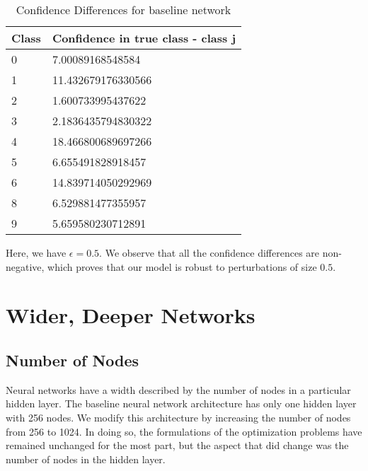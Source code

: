 \documentclass{article}
\begin{document}
\begin{table}[h]
\centering
\begin{tabular}{|l|l|}
\hline
Class & Confidence in true class - class j \\ \hline
0     & 7.00089168548584                   \\ \hline
1     & 11.432679176330566                 \\ \hline
2     & 1.600733995437622                  \\ \hline
3     & 2.1836435794830322                 \\ \hline
4     & 18.466800689697266                 \\ \hline
5     & 6.655491828918457                  \\ \hline
6     & 14.839714050292969                 \\ \hline
8     & 6.529881477355957                  \\ \hline
9     & 5.659580230712891                  \\ \hline
\end{tabular}
\caption{Confidence Differences for baseline network}
\end{table}

Here, we have $\epsilon = 0.5$. We observe that all the confidence differences are non-negative,
which proves that our model is robust to perturbations of size $0.5$.


\section{Wider, Deeper Networks}


\subsection{Number of Nodes}

Neural networks have a width described by the number of nodes in a particular hidden layer. The 
baseline neural network architecture has only one hidden layer with 256 nodes. We modify this
architecture by increasing the number of nodes from 256 to 1024. In doing so, the formulations
of the optimization problems have remained unchanged for the most part, but the aspect that did 
change was the number of nodes in the hidden layer. 
\end{document}
